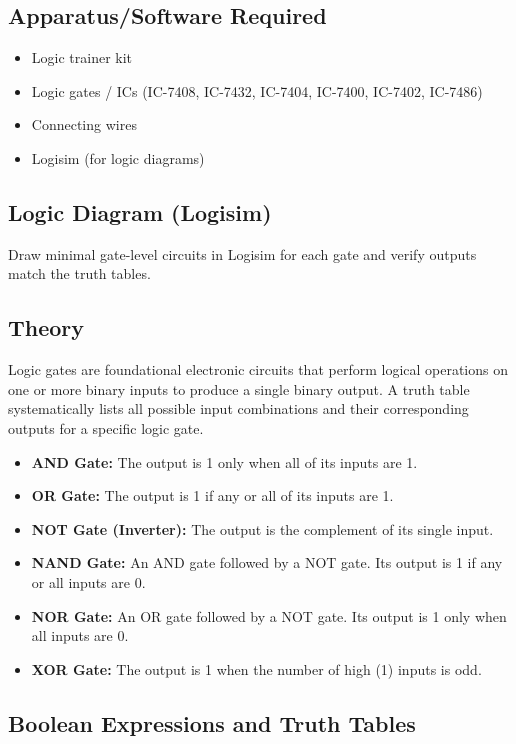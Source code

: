 \documentclass[11pt]{article}
\begin{document}
\subsection{Apparatus/Software Required}
\begin{itemize}
    \item Logic trainer kit
    \item Logic gates / ICs (IC-7408, IC-7432, IC-7404, IC-7400, IC-7402, IC-7486)
    \item Connecting wires
    \item Logisim (for logic diagrams)
\end{itemize}
\subsection{Logic Diagram (Logisim)}
Draw minimal gate-level circuits in Logisim for each gate and verify outputs match the truth tables.


\subsection{Theory}
Logic gates are foundational electronic circuits that perform logical operations on one or more binary inputs to produce a single binary output. A truth table systematically lists all possible input combinations and their corresponding outputs for a specific logic gate.
\begin{itemize}
    \item \textbf{AND Gate:} The output is 1 only when all of its inputs are 1.
    \item \textbf{OR Gate:} The output is 1 if any or all of its inputs are 1.
    \item \textbf{NOT Gate (Inverter):} The output is the complement of its single input.
    \item \textbf{NAND Gate:} An AND gate followed by a NOT gate. Its output is 1 if any or all inputs are 0.
    \item \textbf{NOR Gate:} An OR gate followed by a NOT gate. Its output is 1 only when all inputs are 0.
    \item \textbf{XOR Gate:} The output is 1 when the number of high (1) inputs is odd.
\end{itemize}

\subsection{Boolean Expressions and Truth Tables}
\end{document}

